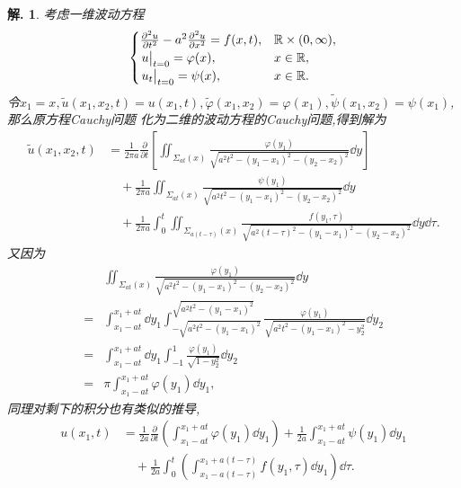 \documentclass[a4paper,oneside,12pt]{ctexart}
\theoremstyle{plain}
\theoremstyle{nonumberplain}
\newtheorem{solution}{解.}
\theoremstyle{nonumberplain}
\newcommand{\ptl}{\partial}
\newcommand{\R}{\mathbb{R}}
\renewcommand{\phi}{\varphi}
\begin{document}
    \begin{solution}
        考虑一维波动方程
        \begin{equation*}
            \begin{cases}
                \frac{\ptl^2 u}{\ptl t^2}-a^2\frac{\ptl^2 u}{\ptl x^2}=f(x,t),&\R\times (0,\infty),\\
                \eval{u}_{t=0}=\phi(x),&x\in\R,\\
                \eval{u_t}_{t=0}=\psi(x),&x\in\R.
            \end{cases}
        \end{equation*}
        令$x_1=x,\tilde{u}(x_1,x_2,t)=u(x_1,t),\tilde{\phi}(x_1,x_2)=\phi(x_1),\tilde{\psi}(x_1,x_2)=\psi(x_1)$,那么原方程Cauchy问题
        化为二维的波动方程的Cauchy问题,得到解为 
        \begin{align*}
            \tilde{u}(x_1,x_2,t)&=\frac{1}{2\pi a}\frac{\ptl}{\ptl t}\left[\iint_{\Sigma_{at}(x)}\frac{\phi(y_1)}{\sqrt{a^2t^2-(y_1-x_1)^2-(y_2-x_2)^2}}\dd y\right]\\
            &\quad+\frac{1}{2\pi a}\iint_{\Sigma_{at}(x)}\frac{\psi(y_1)}{\sqrt{a^2t^2-(y_1-x_1)^2-(y_2-x_2)^2}}\dd y\\
            &\quad+\frac{1}{2\pi a}\int_0^t\iint_{\Sigma_{a(t-\tau)}(x)}\frac{f(y_1,\tau)}{\sqrt{a^2(t-\tau)^2-(y_1-x_1)^2-(y_2-x_2)^2}}\dd y\dd\tau.
        \end{align*}
        又因为 
        \begin{align*}
            &\iint_{\Sigma_{at}(x)}\frac{\phi(y_1)}{\sqrt{a^2t^2-(y_1-x_1)^2-(y_2-x_2)^2}}\dd y\\
            =&\int_{x_1-at}^{x_1+at}\dd y_1\int_{-\sqrt{a^2t^2-(y_1-x_1)^2}}^{\sqrt{a^2t^2-(y_1-x_1)^2}}\frac{\phi(y_1)}{\sqrt{a^2t^2-(y_1-x_1)^2-y_2^2}}\dd y_2\\
            =&\int_{x_1-at}^{x_1+at}\dd y_1\int_{-1}^1\frac{\phi(y_1)}{\sqrt{1-y_2^2}}\dd y_2\\
            =&\pi\int_{x_1-at}^{x_1+at}\phi(y_1)\dd y_1,
        \end{align*}
        同理对剩下的积分也有类似的推导,
        \begin{align*}
            u(x_1,t)&=\frac{1}{2a}\frac{\ptl }{\ptl t}\left(\int_{x_1-at}^{x_1+at}\phi(y_1)\dd y_1\right)+\frac{1}{2a}\int_{x_1-at}^{x_1+at}\psi(y_1)\dd y_1\\
            &\quad +\frac{1}{2a}\int_0^t\left(\int_{x_1-a(t-\tau)}^{x_1+a(t-\tau)}f(y_1,\tau)\dd y_1\right)\dd\tau.
        \end{align*}
    \end{solution}
    
\end{document}
